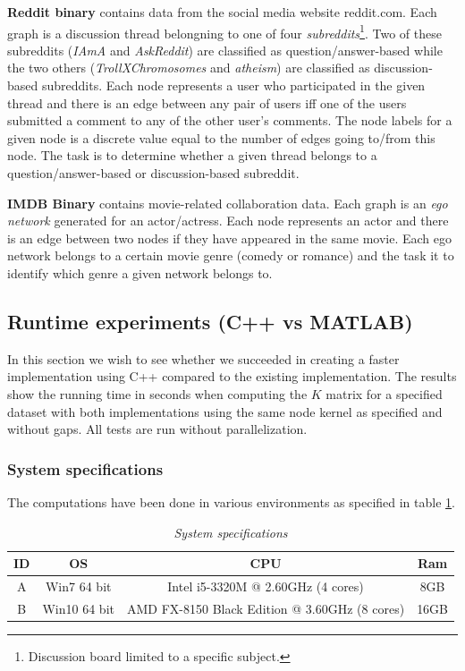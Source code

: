 \documentclass{article}
\begin{document}
\textbf{Reddit binary} \cite{yanardag} contains data from the social media website reddit.com. Each graph is a discussion thread belongning to one of four \textit{subreddits}\footnote{Discussion board limited to a specific subject.}. Two of these subreddits (\textit{IAmA} and \textit{AskReddit}) are classified as question/answer-based while the two others (\textit{TrollXChromosomes} and \textit{atheism}) are classified as discussion-based subreddits. Each node represents a user who participated in the given thread and there is an edge between any pair of users iff one of the users submitted a comment to any of the other user's comments. The node labels for a given node is a discrete value equal to the number of edges going to/from this node. The task is to determine whether a given thread belongs to a question/answer-based or discussion-based subreddit.

\textbf{IMDB Binary} \cite{yanardag} contains movie-related collaboration data. Each graph is an \textit{ego network} generated for an actor/actress. Each node represents an actor and there is an edge between two nodes if they have appeared in the same movie. Each ego network belongs to a certain movie genre (comedy or romance) and the task it to identify which genre a given network belongs to.

\subsection{Runtime experiments (C++ vs MATLAB)}
In this section we wish to see whether we succeeded in creating a faster implementation using C++ compared to the existing implementation. The results show the running time in seconds when computing the $K$ matrix for a specified dataset with both implementations using the same node kernel as specified and without gaps. All tests are run without parallelization.

\subsubsection{System specifications}
The computations have been done in various environments as specified in table \ref{table:specs}.
\begin{table}[H]
	\centering
	\hspace*{-0.7in}
	\scalebox{0.7} {
		\begin{tabular}{c|c|c|c}
			ID & OS & CPU & Ram\\
			\hline
			A & Win7 64 bit & Intel i5-3320M @ 2.60GHz (4 cores) & 8GB \\
			\hline
			B & Win10 64 bit & AMD FX-8150 Black Edition @ 3.60GHz (8 cores) & 16GB
			
		\end{tabular}
	}
	
	\caption{\textit{System specifications}}
	\label{table:specs}
\end{table}
\end{document}
